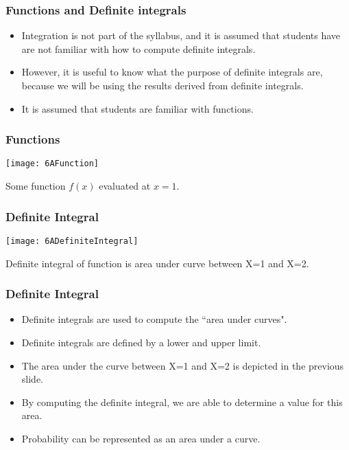 \documentclass[a4]{beamer}
\begin{document}
\begin{frame}
\frametitle{Functions and Definite integrals}
\begin{itemize}
\item Integration is not part of the syllabus, and it is assumed that students have are not familiar with how to compute definite integrals.
\item However,  it is useful to know what the purpose of definite integrals are, because we will be using the results derived from definite integrals. \item It is assumed that students are familiar with functions.
\end{itemize}
\end{frame}
\begin{frame}
\frametitle{Functions}

\vspace{-0.5cm}

\begin{center}
\texttt{[image: 6AFunction]}

\end{center}

Some function $f(x)$ evaluated at $x=1$.
\end{frame}
\begin{frame}
\frametitle{Definite Integral}

\vspace{-0.5cm}
\begin{center}
\texttt{[image: 6ADefiniteIntegral]}
\end{center}
Definite integral of function is area under curve between X=1 and X=2.
\end{frame}
\begin{frame}
\frametitle{Definite Integral}
\begin{itemize}
\item Definite integrals are used to compute the ``area under curves".
\item Definite integrals are defined by a lower and upper limit.
\item The area under the curve between X=1 and  X=2 is depicted in the previous slide.
\item By computing the definite integral, we are able to determine a value for this area.
\item Probability can be represented as an area under a curve.
\end{itemize}
\end{frame}
\end{document}
